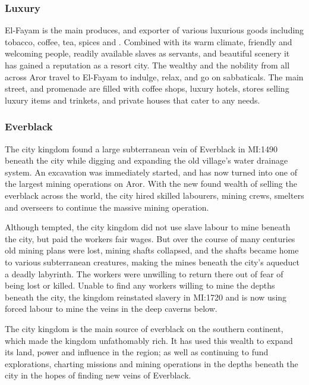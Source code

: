 \subsubsection{Luxury}

El-Fayam is the main produces, and exporter of various luxurious goods
including tobacco, coffee, tea, spices and . Combined
with its warm climate, friendly and welcoming people, readily available slaves
as servants, and beautiful scenery it has gained a reputation as a resort
city. The wealthy and the nobility from all across Aror travel to El-Fayam to
indulge, relax, and go on sabbaticals. The main street, and promenade are
filled with coffee shops, luxury hotels, stores selling luxury items and
trinkets, and private houses that cater to any needs.

\subsubsection{Everblack}

The city kingdom found a large subterranean vein of Everblack in MI:1490
beneath the city while digging and expanding the old village's water drainage
system. An excavation was immediately started, and has now turned into one of
the largest mining operations on Aror. With the new found wealth of selling
the everblack across the world, the city hired skilled labourers, mining
crews, smelters and overseers to continue the massive mining operation.

Although tempted, the city kingdom did not use slave labour to mine beneath
the city, but paid the workers fair wages. But over the course of many
centuries old mining plans were lost, mining shafts collapsed, and the shafts
became home to various subterranean creatures, making the mines beneath the
city's aqueduct a deadly labyrinth. The workers were unwilling to return
there out of fear of being lost or killed. Unable to find any workers willing
to mine the depths beneath the city, the kingdom reinstated slavery in MI:1720
and is now using forced labour to mine the veins in the deep caverns below.

The city kingdom is the main source of everblack on the southern continent,
which made the kingdom unfathomably rich. It has used this wealth to expand
its land, power and influence in the region; as well as continuing to fund
explorations, charting missions and mining operations in the depths beneath
the city in the hopes of finding new veins of Everblack.

